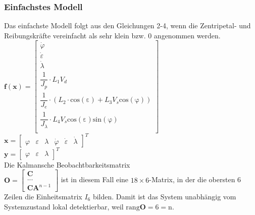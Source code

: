 \documentclass[times, 9pt,twocolumn]{article}
\begin{document}
	\subsubsection{Einfachstes Modell}
	Das einfachste Modell folgt aus den Gleichungen 2-4, wenn die Zentripetal- und Reibungskräfte vereinfacht als sehr klein bzw. 0 angenommen werden. \\
	$\bm f(\bm x) = \begin{bmatrix}
	\dot \varphi \\
	\dot \varepsilon \\
	\dot \lambda  \\
	\dfrac{1}{J_p} \cdot L_1 V_d \\
	\dfrac{1}{J_e} \cdot (L_2 \cdot \mathrm{cos(\varepsilon)} + L_3 V_s \mathrm{cos(\varphi)}) \\
	\dfrac{1}{J_{\lambda}} \cdot L_4 V_s \mathrm{cos(\varepsilon)} \mathrm{sin(\varphi)} \\
	\end{bmatrix} $ \\
	$\bm x = \begin{bmatrix}
	\varphi & \varepsilon & \lambda & \dot \varphi & \dot \varepsilon & \dot \lambda 
	\end{bmatrix}^T $ \\
	$\bm y = \begin{bmatrix}
	\varphi & \varepsilon & \lambda 
	\end{bmatrix}^T $ \\
	Die Kalmansche Beobachtbarkeitsmatrix \\ $\bm O = \begin{bmatrix}
	\bm C \\
	... \\
	\bm C \bm A^{n-1}
	\end{bmatrix}$ ist in diesem Fall eine $18\times 6$-Matrix, in der die obersten 6 Zeilen die Einheitsmatrix $I_6$ bilden. Damit ist das System unabhängig vom Systemzustand lokal detektierbar, weil $\mathrm{rang} \bm O = 6 = \mathrm{n}$.
\end{document}
